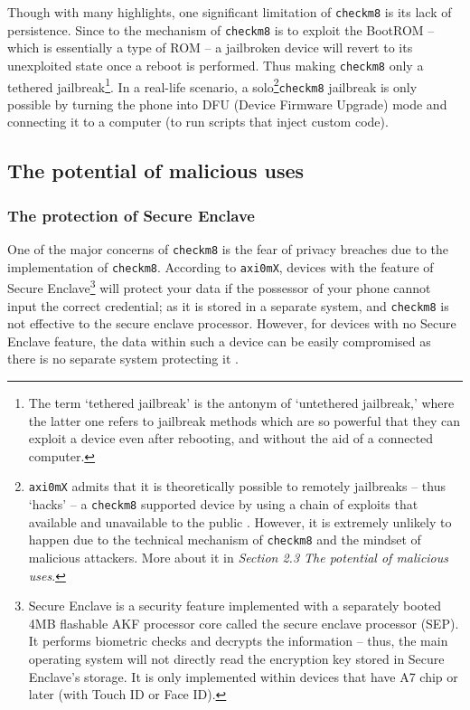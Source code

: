 \documentclass[10pt]{article}
\newcommand{\inlinecode}{\texttt}
\begin{document}
Though with many highlights, one significant limitation of \inlinecode{checkm8} is its lack of persistence. Since to the mechanism of \inlinecode{checkm8} is to exploit the BootROM -- which is essentially a type of ROM -- a jailbroken device will revert to its unexploited state once a reboot is performed. Thus making \inlinecode{checkm8} only a tethered jailbreak\footnote{The term `tethered jailbreak' is the antonym of `untethered jailbreak,' where the latter one refers to jailbreak methods which are so powerful that they can exploit a device even after rebooting, and without the aid of a connected computer.}. In a real-life scenario, a solo\footnote{\inlinecode{axi0mX} admits that it is theoretically possible to remotely jailbreaks -- thus `hacks' -- a \inlinecode{checkm8} supported device by using a chain of exploits that available and unavailable to the public \cite{cite:3}. However, it is extremely unlikely to happen due to the technical mechanism of \inlinecode{checkm8} and the mindset of malicious attackers. More about it in \textit{Section 2.3 The potential of malicious uses}.}\inlinecode{checkm8} jailbreak is only possible by turning the phone into DFU (Device Firmware Upgrade) mode and connecting it to a computer (to run scripts that inject custom code).

\subsection{The potential of malicious uses}
\subsubsection{The protection of Secure Enclave}
One of the major concerns of \inlinecode{checkm8} is the fear of privacy breaches due to the implementation of \inlinecode{checkm8}. According to \inlinecode{axi0mX}, devices with the feature of Secure Enclave\footnote{Secure Enclave is a security feature implemented with a separately booted 4MB flashable AKF processor core called the secure enclave processor (SEP). It performs biometric checks and decrypts the information -- thus, the main operating system will not directly read the encryption key stored in Secure Enclave's storage. It is only implemented within devices that have A7 chip or later (with Touch ID or Face ID).} will protect your data if the possessor of your phone cannot input the correct credential; as it is stored in a separate system, and \inlinecode{checkm8} is not effective to the secure enclave processor. However, for devices with no Secure Enclave feature, the data within such a device can be easily compromised as there is no separate system protecting it \cite{cite:3}.
\end{document}
